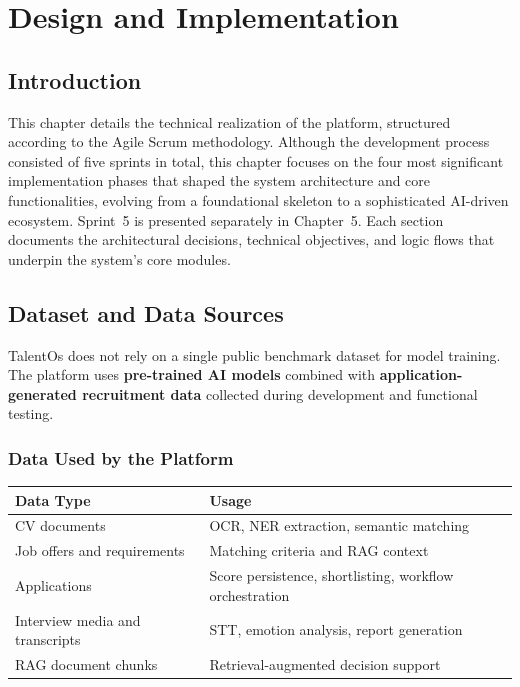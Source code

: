 \chapter{Design and Implementation} \label{chap4}
\minitoc
\newpage

\section*{Introduction}
This chapter details the technical realization of the platform, structured according to the Agile Scrum methodology. Although the development process consisted of five sprints in total, this chapter focuses on the four most significant implementation phases that shaped the system architecture and core functionalities, evolving from a foundational skeleton to a sophisticated AI-driven ecosystem. Sprint~5 is presented separately in Chapter~5. Each section documents the architectural decisions, technical objectives, and logic flows that underpin the system's core modules.
\section{Dataset and Data Sources}
\label{sec:ch4:dataset}

TalentOs does not rely on a single public benchmark dataset for model training. The platform uses \textbf{pre-trained AI models} combined with \textbf{application-generated recruitment data} collected during development and functional testing.

\subsection{Data Used by the Platform}

\begin{center}
\label{tab:dataset_categories}
\renewcommand{\arraystretch}{1.2}
\begin{tabularx}{\textwidth}{|l|X|}
\hline
\rowcolor{gray!20} \textbf{Data Type} & \textbf{Usage} \\
\hline
CV documents & OCR, NER extraction, semantic matching \\
\hline
Job offers and requirements & Matching criteria and RAG context \\
\hline
Applications & Score persistence, shortlisting, workflow orchestration \\
\hline
Interview media and transcripts & STT, emotion analysis, report generation \\
\hline
RAG document chunks & Retrieval-augmented decision support \\
\hline
\end{tabularx}
\end{center}

